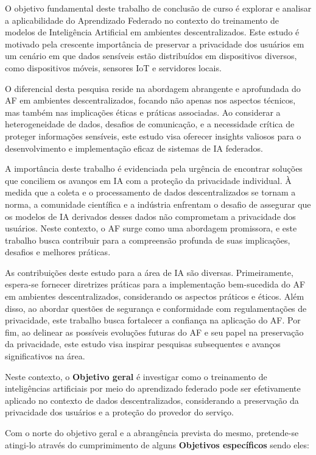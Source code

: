 O objetivo fundamental deste trabalho de conclusão de curso é explorar e analisar a aplicabilidade do Aprendizado Federado no contexto do treinamento de modelos de Inteligência Artificial em ambientes descentralizados. Este estudo é motivado pela crescente importância de preservar a privacidade dos usuários em um cenário em que dados sensíveis estão distribuídos em dispositivos diversos, como dispositivos móveis, sensores IoT e servidores locais.

O diferencial desta pesquisa reside na abordagem abrangente e aprofundada do AF em ambientes descentralizados, focando não apenas nos aspectos técnicos, mas também nas implicações éticas e práticas associadas. Ao considerar a heterogeneidade de dados, desafios de comunicação, e a necessidade crítica de proteger informações sensíveis, este estudo visa oferecer insights valiosos para o desenvolvimento e implementação eficaz de sistemas de IA federados.

A importância deste trabalho é evidenciada pela urgência de encontrar soluções que conciliem os avanços em IA com a proteção da privacidade individual. À medida que a coleta e o processamento de dados descentralizados se tornam a norma, a comunidade científica e a indústria enfrentam o desafio de assegurar que os modelos de IA derivados desses dados não comprometam a privacidade dos usuários. Neste contexto, o AF surge como uma abordagem promissora, e este trabalho busca contribuir para a compreensão profunda de suas implicações, desafios e melhores práticas.

As contribuições deste estudo para a área de IA são diversas. Primeiramente, espera-se fornecer diretrizes práticas para a implementação bem-sucedida do AF em ambientes descentralizados, considerando os aspectos práticos e éticos. Além disso, ao abordar questões de segurança e conformidade com regulamentações de privacidade, este trabalho busca fortalecer a confiança na aplicação do AF. Por fim, ao delinear as possíveis evoluções futuras do AF e seu papel na preservação da privacidade, este estudo visa inspirar pesquisas subsequentes e avanços significativos na área.

Neste contexto, o \textbf{Objetivo geral} é investigar como o treinamento de inteligências artificiais por meio do aprendizado federado pode ser efetivamente aplicado no contexto de dados descentralizados, considerando a preservação da privacidade dos usuários e a proteção do provedor do serviço. 

Com o norte do objetivo geral e a abrangência prevista do mesmo, pretende-se atingi-lo através do cumprimimento de alguns \textbf{Objetivos específicos} sendo eles: 

